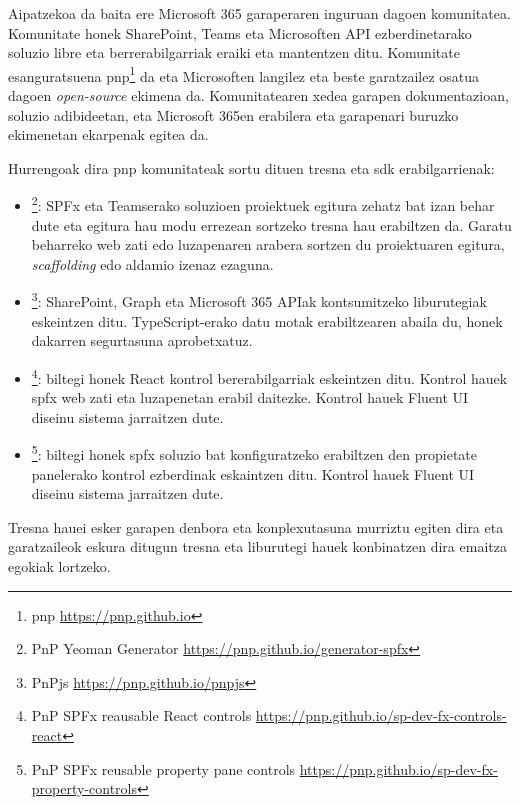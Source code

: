 Aipatzekoa da baita ere Microsoft 365 garaperaren inguruan dagoen komunitatea. Komunitate honek SharePoint, Teams eta Microsoften API
ezberdinetarako soluzio libre eta berrerabilgarriak eraiki eta mantentzen ditu. Komunitate esanguratsuena
\acrfull{pnp}\footnote{\acrfull{pnp} \url{https://pnp.github.io}} da 
eta Microsoften langilez eta beste garatzailez osatua dagoen \textit{open-source} ekimena da.
Komunitatearen xedea garapen dokumentazioan, soluzio adibideetan, eta Microsoft 365en erabilera eta garapenari buruzko ekimenetan
ekarpenak egitea da. 

Hurrengoak dira \acrshort{pnp} komunitateak sortu dituen tresna eta \acrshort{sdk} erabilgarrienak:
\begin{itemize}
  \item {}\footnote{PnP Yeoman Generator \url{https://pnp.github.io/generator-spfx}}: SPFx eta Teamserako soluzioen proiektuek egitura zehatz bat izan
  behar dute eta egitura hau modu errezean sortzeko tresna hau erabiltzen da. Garatu beharreko web zati edo luzapenaren arabera sortzen du
  proiektuaren egitura, \textit{scaffolding} edo aldamio izenaz ezaguna. 
  \item {}\footnote{PnPjs \url{https://pnp.github.io/pnpjs}}: SharePoint, Graph eta Microsoft 365 APIak kontsumitzeko liburutegiak eskeintzen ditu.
  TypeScript-erako datu motak erabiltzearen abaila du, honek dakarren segurtasuna aprobetxatuz. 
  \item {}\footnote{PnP SPFx reausable React controls \url{https://pnp.github.io/sp-dev-fx-controls-react}}: biltegi honek React kontrol bererabilgarriak eskeintzen ditu. Kontrol
  hauek \acrshort{spfx} web zati eta luzapenetan erabil daitezke. Kontrol hauek Fluent UI diseinu sistema jarraitzen dute. 
  \item {}\footnote{PnP SPFx reusable property pane controls \url{https://pnp.github.io/sp-dev-fx-property-controls}}: biltegi honek \acrshort{spfx} soluzio bat konfiguratzeko
  erabiltzen den propietate panelerako kontrol ezberdinak eskaintzen ditu. Kontrol hauek Fluent UI diseinu sistema jarraitzen dute.
\end{itemize}

Tresna hauei esker garapen denbora eta konplexutasuna murriztu egiten dira eta garatzaileok eskura ditugun tresna eta liburutegi hauek
konbinatzen dira emaitza egokiak lortzeko.

